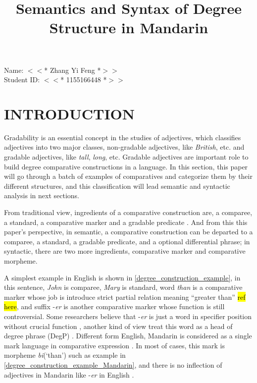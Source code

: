 \documentclass{ctexart}
\title{Semantics and Syntax of Degree Structure in Mandarin}
\date{\vspace{-10ex}}
\let \cite \parencite
\begin{document}
\thispagestyle{empty} %

\begin{center}

Name: $<<$* Zhang Yi Feng *$>>$ \\
Student ID: $<<$* 1155166448 *$>>$

\end{center}

{\let\newpage\relax\maketitle}

\section{INTRODUCTION}

\setcounter{page}{1}

\noindent
Gradability is an essential concept in the studies of adjectives, which classifies adjectives into two major classes, non-gradable adjectives, like \textit{British}, etc. and gradable adjectives, like \textit{tall}, \textit{long}, etc. Gradable adjectives are important role to build degree comparative constructions in a language. In this section, this paper will go through a batch of examples of comparatives and categorize them by their different structures, and this classification will lead semantic and syntactic analysis in next sections. 

From traditional view, ingredients of a comparative construction are, a comparee, a standard, a comparative marker and a gradable predicate \cite{guo2012}. And from this this paper's perspective, in semantic, a comparative construction can be departed to a comparee, a standard, a gradable predicate, and a optional differential phrase; in syntactic, there are two more ingredients, comparative marker and comparative morpheme.

A simplest example in English is shown in \ref{degree_construction_example}, in this sentence, \textit{John} is comparee, \textit{Mary} is standard, word \textit{than} is a comparative marker whose job is introduce strict partial relation meaning ``greater than'' \hl{ref here}, and suffix -\textit{er} is another comparative marker whose function is still controversial. Some researchers believe that -\textit{er} is just a word in specifier position without crucial function \cite{von1984a,heim1985,bhatt2004,rullmann1995}, another kind of view treat this word as a head of degree phrase (DegP) \cite{bierwisch1989,corver1990,corver1993,corver1997a,kennedy1997,grano2012}. Different form English, Mandarin is considered as a single mark language in comparative expression \cite{bobaljik2012,grano2012}. In most of cases, this mark is morpheme \textit{bi}(`than') such as example in \ref{degree_construction_example_Mandarin}, and there is no inflection of adjectives in Mandarin like -\textit{er} in English \cite{guo2012}. 
\end{document}
